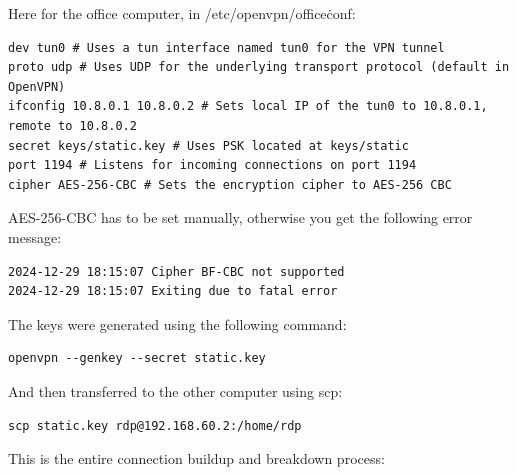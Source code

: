 Here for the office computer, in /etc/openvpn/office\.conf:

\begin{verbatim}
dev tun0 # Uses a tun interface named tun0 for the VPN tunnel
proto udp # Uses UDP for the underlying transport protocol (default in OpenVPN)
ifconfig 10.8.0.1 10.8.0.2 # Sets local IP of the tun0 to 10.8.0.1, remote to 10.8.0.2
secret keys/static.key # Uses PSK located at keys/static
port 1194 # Listens for incoming connections on port 1194
cipher AES-256-CBC # Sets the encryption cipher to AES-256 CBC
\end{verbatim}
AES-256-CBC has to be set manually, otherwise you get the following error message:

\begin{verbatim}
2024-12-29 18:15:07 Cipher BF-CBC not supported
2024-12-29 18:15:07 Exiting due to fatal error
\end{verbatim}


The keys were generated using the following command:

\begin{verbatim}
openvpn --genkey --secret static.key
\end{verbatim}

And then transferred to the other computer using scp:

\begin{verbatim}
scp static.key rdp@192.168.60.2:/home/rdp
\end{verbatim}

This is the entire connection buildup and breakdown process:

